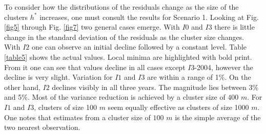 \documentclass[Journal]{ascelike}
\begin{document}
To consider how the distributions of the residuals change as the size of the clusters
$h^*$ increases, one must consult the results for Scenario 1. Looking at Fig. \ref{fig5} through
Fig. \ref{fig7} two general cases emerge. With $I0$ and $I3$ there is little change in the standard
deviation of the residuals as the cluster size changes. With $I2$ one can observe an
initial decline followed by a constant level. Table \ref{table5} shows the actual values. Local
minima are highlighted with bold print. From it one can see that values decline in all
cases except $I3$-2004, however the decline is very slight. Variation for $I1$ and $I3$ are within a range of 1\%. On the other hand, $I2$ declines visibly in all three years. The magnitude lies between 3\% and 5\%. Most of the variance reduction is achieved by a cluster size of $400$ $m$. For $I1$ and $I3$, clusters of size 100 $m$ seem equally effective as clusters of size 1000 $m$. One notes that estimates from a cluster size of $100$ $m$ is the simple average of the two nearest observation.
\end{document}
